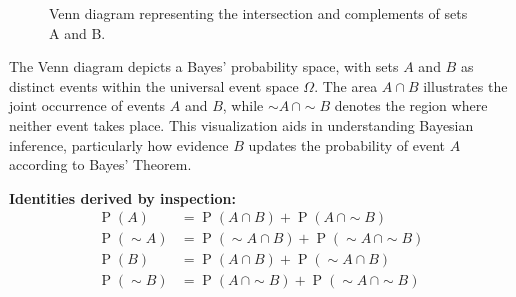 \documentclass[
  12 pt,
  a4paper,
]{book}
\numberwithin{equation}{section}
\theoremstyle{plain}      %
\theoremstyle{definition} %
\theoremstyle{remark}     %
\theoremstyle{note}         %
\begin{document}
\begin{figure}[htbp]
\centering
{}
\caption{Venn diagram representing the intersection and complements of sets A and B.}
\label{fig:venn-diagram}
\end{figure}

The Venn diagram depicts a Bayes' probability space, with sets \(A\) and
\(B\) as distinct events within the universal event space \(\Omega\).
The area \(A \cap B\) illustrates the joint occurrence of events \(A\)
and \(B\), while \(\sim\! A \, \cap \sim\! B\) denotes the region where
neither event takes place. This visualization aids in understanding
Bayesian inference, particularly how evidence \(B\) updates the
probability of event \(A\) according to Bayes' Theorem.

\textbf{Identities derived by inspection:} \[\begin{aligned} 
\operatorname{P}(A) &=\operatorname{P}(A \cap B)+\operatorname{P}(A\, \cap \sim B) \\ 
\operatorname{P}(\sim A)&=\operatorname{P}(\sim A \cap B)+\operatorname{P}(\sim A\, \cap \sim B) \\ 
\operatorname{P}(B)&=\operatorname{P}(A \cap B)+\operatorname{P}(\sim A \cap B) \\ 
\operatorname{P}(\sim B)&=\operatorname{P}(A\, \cap \sim B)+\operatorname{P}(\sim A\, \cap \sim B)
\end{aligned}\]
\end{document}
